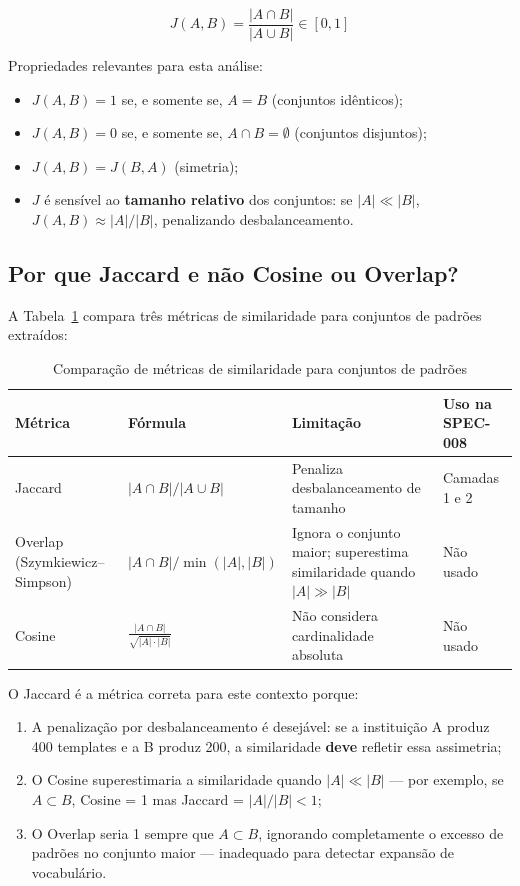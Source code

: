 \documentclass[12pt,a4paper]{article}
\theoremstyle{remark}
\begin{document}
\begin{equation}
J(A, B) = \frac{|A \cap B|}{|A \cup B|} \in [0, 1]
\label{eq:jaccard}
\end{equation}

Propriedades relevantes para esta análise:
\begin{itemize}[nosep]
  \item $J(A,B) = 1$ se, e somente se, $A = B$ (conjuntos idênticos);
  \item $J(A,B) = 0$ se, e somente se, $A \cap B = \emptyset$ (conjuntos disjuntos);
  \item $J(A,B) = J(B,A)$ (simetria);
  \item $J$ é sensível ao \textbf{tamanho relativo} dos conjuntos: se $|A| \ll |B|$, $J(A,B) \approx |A|/|B|$, penalizando desbalanceamento.
\end{itemize}

\subsection{Por que Jaccard e não Cosine ou Overlap?}

A Tabela~\ref{tab:metricas} compara três métricas de similaridade para conjuntos de padrões extraídos:

\begin{table}[H]\centering\footnotesize
\caption{Comparação de métricas de similaridade para conjuntos de padrões}
\label{tab:metricas}
\begin{tabular}{p{}p{}p{}p{}}
\toprule
\textbf{Métrica} & \textbf{Fórmula} & \textbf{Limitação} & \textbf{Uso na SPEC-008} \\
\midrule
Jaccard & $|A \cap B| / |A \cup B|$ & Penaliza desbalanceamento de tamanho & Camadas 1 e 2 \\
Overlap (Szymkiewicz–Simpson) & $|A \cap B| / \min(|A|, |B|)$ & Ignora o conjunto maior; superestima similaridade quando $|A| \gg |B|$ & Não usado \\
Cosine & $\frac{|A \cap B|}{\sqrt{|A| \cdot |B|}}$ & Não considera cardinalidade absoluta & Não usado \\
\bottomrule
\end{tabular}
\end{table}

O Jaccard é a métrica correta para este contexto porque:
\begin{enumerate}[label=(\alph*), nosep]
  \item A penalização por desbalanceamento é desejável: se a instituição A produz 400 templates e a B produz 200, a similaridade \textbf{deve} refletir essa assimetria;
  \item O Cosine superestimaria a similaridade quando $|A| \ll |B|$ — por exemplo, se $A \subset B$, Cosine = 1 mas Jaccard = $|A|/|B| < 1$;
  \item O Overlap seria 1 sempre que $A \subset B$, ignorando completamente o excesso de padrões no conjunto maior — inadequado para detectar expansão de vocabulário.
\end{enumerate}
\end{document}
